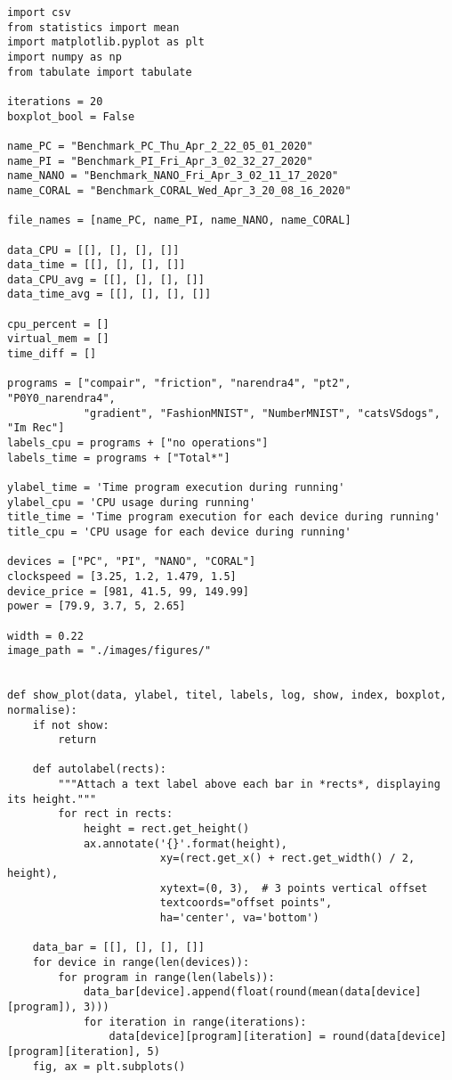 \begin{lstlisting}
import csv
from statistics import mean
import matplotlib.pyplot as plt
import numpy as np
from tabulate import tabulate

iterations = 20
boxplot_bool = False

name_PC = "Benchmark_PC_Thu_Apr_2_22_05_01_2020"
name_PI = "Benchmark_PI_Fri_Apr_3_02_32_27_2020"
name_NANO = "Benchmark_NANO_Fri_Apr_3_02_11_17_2020"
name_CORAL = "Benchmark_CORAL_Wed_Apr_3_20_08_16_2020"

file_names = [name_PC, name_PI, name_NANO, name_CORAL]

data_CPU = [[], [], [], []]
data_time = [[], [], [], []]
data_CPU_avg = [[], [], [], []]
data_time_avg = [[], [], [], []]

cpu_percent = []
virtual_mem = []
time_diff = []

programs = ["compair", "friction", "narendra4", "pt2", "P0Y0_narendra4",
			"gradient", "FashionMNIST", "NumberMNIST", "catsVSdogs", "Im Rec"]
labels_cpu = programs + ["no operations"]
labels_time = programs + ["Total*"]

ylabel_time = 'Time program execution during running'
ylabel_cpu = 'CPU usage during running'
title_time = 'Time program execution for each device during running'
title_cpu = 'CPU usage for each device during running'

devices = ["PC", "PI", "NANO", "CORAL"]
clockspeed = [3.25, 1.2, 1.479, 1.5]
device_price = [981, 41.5, 99, 149.99]
power = [79.9, 3.7, 5, 2.65]

width = 0.22
image_path = "./images/figures/"


def show_plot(data, ylabel, titel, labels, log, show, index, boxplot, normalise):
	if not show:
		return
	
	def autolabel(rects):
		"""Attach a text label above each bar in *rects*, displaying its height."""
		for rect in rects:
			height = rect.get_height()
			ax.annotate('{}'.format(height),
						xy=(rect.get_x() + rect.get_width() / 2, height),
						xytext=(0, 3),  # 3 points vertical offset
						textcoords="offset points",
						ha='center', va='bottom')
		
	data_bar = [[], [], [], []]
	for device in range(len(devices)):
		for program in range(len(labels)):
			data_bar[device].append(float(round(mean(data[device][program]), 3)))
			for iteration in range(iterations):
				data[device][program][iteration] = round(data[device][program][iteration], 5)
	fig, ax = plt.subplots()
	

\end{lstlisting}
